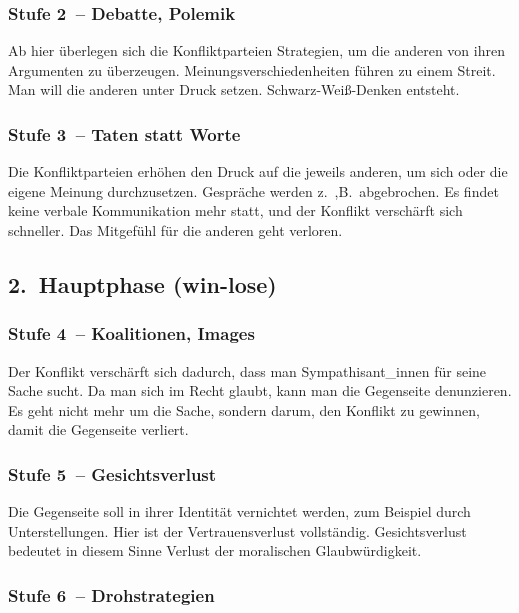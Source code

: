 \subsubsection{Stufe 2~-- Debatte, Polemik}

Ab hier überlegen sich die Konfliktparteien Strategien, um die anderen von ihren Argumenten zu überzeugen. Meinungsverschiedenheiten führen zu einem Streit. Man will die anderen unter Druck setzen. Schwarz-Weiß-Denken entsteht.

\subsubsection{Stufe 3~-- Taten statt Worte}

Die Konfliktparteien erhöhen den Druck auf die jeweils anderen, um sich oder die eigene Meinung durchzusetzen. Gespräche werden z.~,B.~abgebrochen. Es findet keine verbale Kommunikation mehr statt, und der Konflikt verschärft sich schneller. Das Mitgefühl für die \glqq anderen\grqq{} geht verloren.


\subsection{2.~Hauptphase (win-lose)}

\subsubsection{Stufe 4~-- Koalitionen, Images}

Der Konflikt verschärft sich dadurch, dass man Sympathisant\_innen für seine Sache sucht. Da man sich im Recht glaubt, kann man die Gegenseite denunzieren. Es geht nicht mehr um die Sache, sondern darum, den Konflikt zu gewinnen, damit die Gegenseite verliert.

\subsubsection{Stufe 5~-- Gesichtsverlust}

Die Gegenseite soll in ihrer Identität vernichtet werden, zum Beispiel durch Unterstellungen. Hier ist der Vertrauensverlust vollständig. Gesichtsverlust bedeutet in diesem Sinne Verlust der moralischen Glaubwürdigkeit.

\subsubsection{Stufe 6~-- Drohstrategien}

